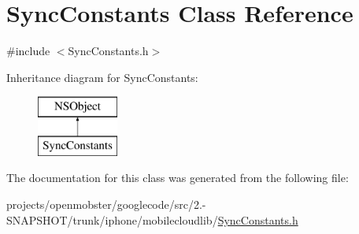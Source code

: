 \hypertarget{interface_sync_constants}{
\section{\-Sync\-Constants \-Class \-Reference}
\label{interface_sync_constants}
}


{\ttfamily \#include $<$\-Sync\-Constants.\-h$>$}

\-Inheritance diagram for \-Sync\-Constants\-:\begin{figure}[H]
\begin{center}
\leavevmode
\includegraphics[height=2.000000cm]{interface_sync_constants}
\end{center}
\end{figure}


\-The documentation for this class was generated from the following file\-:\begin{DoxyCompactItemize}
\item 
projects/openmobster/googlecode/src/2.-\/\-S\-N\-A\-P\-S\-H\-O\-T/trunk/iphone/mobilecloudlib/\hyperlink{_sync_constants_8h}{\-Sync\-Constants.\-h}\end{DoxyCompactItemize}
